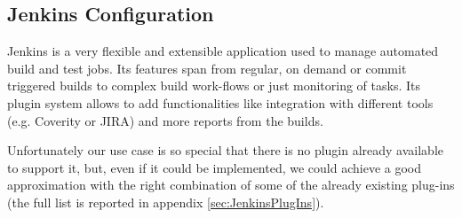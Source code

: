 \subsection{Jenkins Configuration}
\label{sec:Jenkins}
Jenkins is a very flexible and extensible application used to manage automated
build and test jobs.  Its features span from regular, on demand or commit
triggered builds to complex build work-flows or just monitoring of tasks.  Its
plugin system allows to add functionalities like integration with different
tools (e.g. Coverity or JIRA) and more reports from the builds.

Unfortunately our use case is so special that there is no plugin already
available to support it, but, even if it could be implemented, we could achieve
a good approximation with the right combination of some of the already existing
plug-ins (the full list is reported in appendix \ref{sec:JenkinsPlugIns}).

